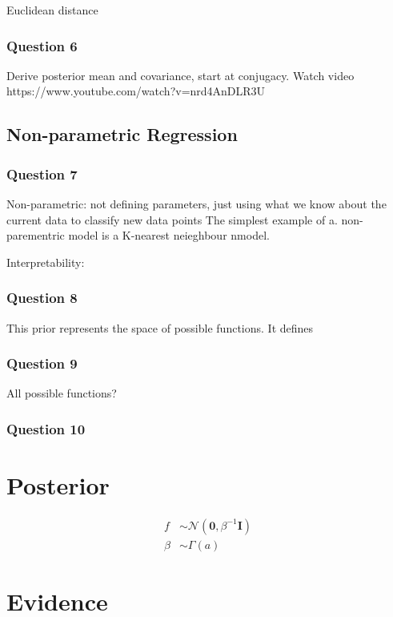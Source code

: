 \documentclass[10pt, a4paper, twocolumn]{article} %
\begin{document}
Euclidean distance

\subsubsection*{Question 6}

Derive posterior mean and covariance, start at conjugacy. Watch video https://www.youtube.com/watch?v=nrd4AnDLR3U

\subsection{Non-parametric Regression}

\subsubsection*{Question 7}

Non-parametric: not defining parameters, just using what we know about the current data to classify new data points
The simplest example of a. non-parementric model is a K-nearest neieghbour nmodel.

Interpretability: 

\subsubsection*{Question 8}

This prior represents the space of possible functions. It defines

\subsubsection*{Question 9}

All possible functions?

\subsubsection*{Question 10}



\section{Posterior}

\begin{align}
  f &\sim \mathcal{N}\left(\boldsymbol{0},\beta^{-1}\mathbf{I}\right)\\
  \beta &\sim \Gamma(a)
\end{align}

\section{Evidence}


\printbibliography[title={Bibliography}] %

\end{document}
